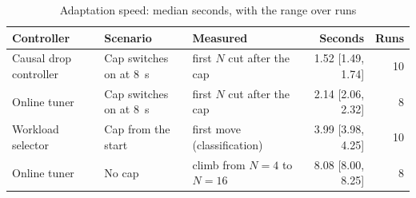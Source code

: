 \begin{table}[H]\centering
\caption{Adaptation speed: median seconds, with the range over runs}\label{tab:adapt}
\small
\begin{tabularx}{\linewidth}{@{}llLrr@{}}
\toprule
\textbf{Controller} & \textbf{Scenario} & \textbf{Measured} & \textbf{Seconds} & \textbf{Runs}\\
\midrule
Causal drop controller & Cap switches on at 8~s & first $N$ cut after the cap & 1.52 [1.49, 1.74] & 10\\
Online tuner & Cap switches on at 8~s & first $N$ cut after the cap & 2.14 [2.06, 2.32] & 8\\
Workload selector & Cap from the start & first move (classification) & 3.99 [3.98, 4.25] & 10\\
Online tuner & No cap & climb from $N=4$ to $N=16$ & 8.08 [8.00, 8.25] & 8\\
\bottomrule
\end{tabularx}
\end{table}
